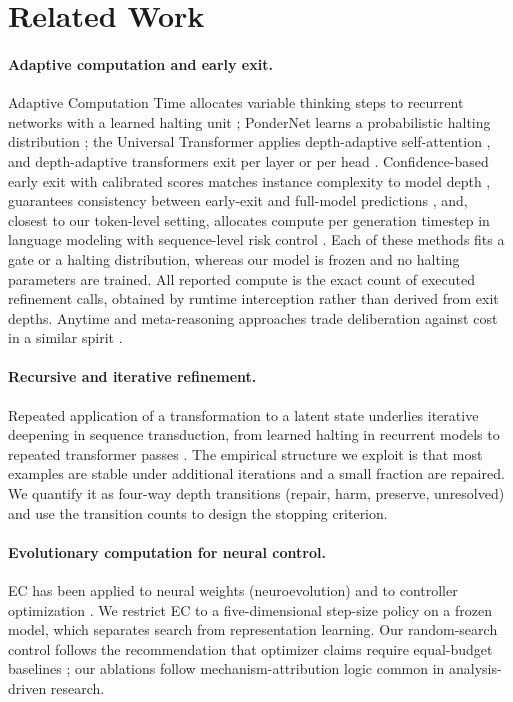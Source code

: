 \documentclass[11pt]{article}
\begin{document}
\section{Related Work}
\label{sec:related}

\paragraph{Adaptive computation and early exit.}
Adaptive Computation Time allocates variable thinking steps to recurrent networks with a learned halting unit \citep{graves2016adaptive}; PonderNet learns a probabilistic halting distribution \citep{banino2021ponder}; the Universal Transformer applies depth-adaptive self-attention \citep{dehghani2019universal}, and depth-adaptive transformers exit per layer or per head \citep{elbayad2020depth}. Confidence-based early exit with calibrated scores matches instance complexity to model depth \citep{schwartz2020right}, guarantees consistency between early-exit and full-model predictions \citep{schuster2021cats}, and, closest to our token-level setting, allocates compute per generation timestep in language modeling with sequence-level risk control \citep{schuster2022calm}. Each of these methods fits a gate or a halting distribution, whereas our model is frozen and no halting parameters are trained. All reported compute is the exact count of executed refinement calls, obtained by runtime interception rather than derived from exit depths. Anytime and meta-reasoning approaches trade deliberation against cost in a similar spirit \citep{zilberstein1996anytime}.

\paragraph{Recursive and iterative refinement.}
Repeated application of a transformation to a latent state underlies iterative deepening in sequence transduction, from learned halting in recurrent models \citep{graves2016adaptive} to repeated transformer passes \citep{dehghani2019universal}. The empirical structure we exploit is that most examples are stable under additional iterations and a small fraction are repaired. We quantify it as four-way depth transitions (repair, harm, preserve, unresolved) and use the transition counts to design the stopping criterion.

\paragraph{Evolutionary computation for neural control.}
EC has been applied to neural weights (neuroevolution) \citep{stanley2019designing} and to controller optimization \citep{eiben2015introduction}. We restrict EC to a five-dimensional step-size policy on a frozen model, which separates search from representation learning. Our random-search control follows the recommendation that optimizer claims require equal-budget baselines \citep{eiben2015introduction}; our ablations follow mechanism-attribution logic common in analysis-driven research.
\end{document}
